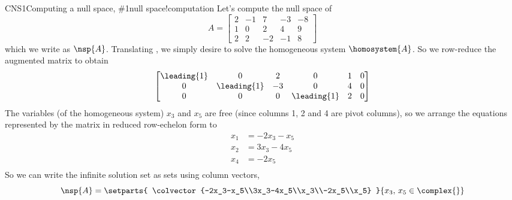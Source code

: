\begin{example}{CNS1}{Computing a null space, \protect\#1}{null space!computation}
Let's compute the null space of
%
\begin{equation*}
A=\begin{bmatrix}
 2 & -1 & 7 & -3 & -8 \\
 1 & 0 & 2 & 4 & 9 \\
 2 & 2 & -2 & -1 & 8
\end{bmatrix}
\end{equation*}
%
which we write as $\nsp{A}$.   Translating , we simply desire to solve the homogeneous system $\homosystem{A}$.  So we row-reduce the augmented matrix to obtain
%
\begin{equation*}
\begin{bmatrix}
 \leading{1} & 0 & 2 & 0 & 1 & 0 \\
 0 & \leading{1} & -3 & 0 & 4 & 0 \\
 0 & 0 & 0 & \leading{1} & 2 & 0 
\end{bmatrix}
\end{equation*}
%
The variables (of the homogeneous system) $x_3$ and $x_5$ are free (since columns 1, 2 and 4 are pivot columns), so we arrange the equations represented by the matrix in reduced row-echelon form to
%
\begin{align*}
x_1&=-2x_3-x_5\\
x_2&=3x_3-4x_5\\
x_4&=-2x_5\\
\end{align*}
%
So we can write the infinite solution set as sets using column vectors,
%
\begin{equation*}
\nsp{A}=\setparts{
\colvector{-2x_3-x_5\\3x_3-4x_5\\x_3\\-2x_5\\x_5}
}{
x_3,\,x_5\in\complex{\null}
}
\end{equation*}
%
\end{example}
%
